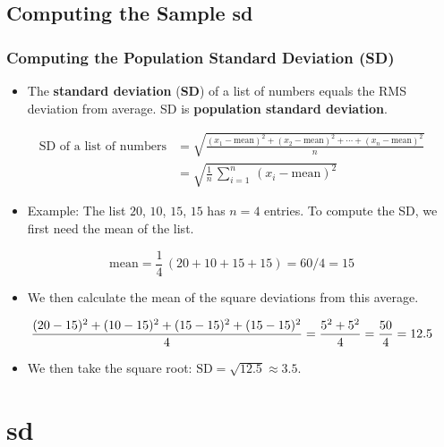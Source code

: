 \documentclass[t]{beamer}
\begin{document}
\subsection{Computing the Sample sd}
\begin{frame}[t]\frametitle{Computing the Population Standard Deviation (SD)}
{\small
\begin{itemize}
\item The \textbf{standard deviation} (\textbf{SD}) 
  of a list of numbers equals the RMS deviation from average. SD is
  \textbf{population standard deviation}.\vspace{-9pt}
\end{itemize}
{\footnotesize
\begin{align*}
\mbox{SD of a list of numbers} &= \sqrt{\frac{(x_1-\mbox{mean})^2+(x_2-\mbox{mean})^2+\cdots + (x_n-\mbox{mean})^2}{n}}\\
                               &=\sqrt{\frac{1}{n}\,\sum_{i=1}^n\,(x_i-\mbox{mean})^2}
\end{align*}}\vspace{-12pt}
\begin{itemize}
\item Example:  The list $20$, $10$, $15$, $15$ has $n=4$ entries.  
To compute the SD, we first need the mean of the list.
\end{itemize}
{\footnotesize\[\mbox{mean}=\frac{1}{4}\,(20+10+15+15) = 60/4 = 15\]}\vspace{-15pt}
\begin{itemize}
\item[] We then calculate the mean of the square deviations from this average.
\end{itemize}\vspace{2pt}
{\footnotesize
\[\frac{(20-15)^2 + (10-15)^2 + (15-15)^2 + (15-15)^2}{4}=\frac{5^2 + 5^2}{4}=\frac{50}{4}=12.5\vspace{-8pt}\]}
\begin{itemize}
\item[] We then take the square root:  $\mbox{SD}=\sqrt{12.5}\approx 3.5$.
\end{itemize}
}
\end{frame}

\section{sd}
\end{document}
